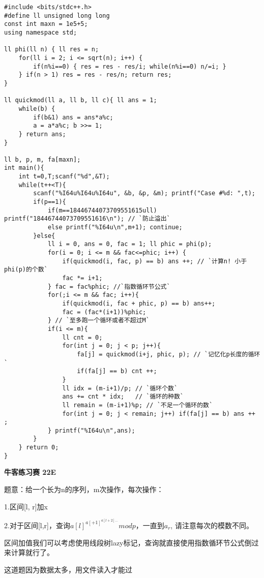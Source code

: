 \begin{lstlisting}
#include <bits/stdc++.h>
#define ll unsigned long long
const int maxn = 1e5+5;
using namespace std;

ll phi(ll n) { ll res = n;
    for(ll i = 2; i <= sqrt(n); i++) {
        if(n%i==0) { res = res - res/i; while(n%i==0) n/=i; }
    } if(n > 1) res = res - res/n; return res;
}

ll quickmod(ll a, ll b, ll c){ ll ans = 1;
    while(b) {
        if(b&1) ans = ans*a%c;
        a = a*a%c; b >>= 1;
    } return ans;
}

ll b, p, m, fa[maxn];
int main(){
    int t=0,T;scanf("%d",&T);
    while(t++<T){
        scanf("%I64u%I64u%I64u", &b, &p, &m); printf("Case #%d: ",t);
        if(p==1){
            if(m==18446744073709551615ull) printf("18446744073709551616\n"); // `防止溢出`
            else printf("%I64u\n",m+1); continue;
        }else{
            ll i = 0, ans = 0, fac = 1; ll phic = phi(p);
            for(i = 0; i <= m && fac<=phic; i++) {
                if(quickmod(i, fac, p) == b) ans ++; // `计算n! 小于 phi(p)的个数`
                fac *= i+1;
            } fac = fac%phic; //`指数循环节公式`
            for(;i <= m && fac; i++){
                if(quickmod(i, fac + phic, p) == b) ans++;
                fac = (fac*(i+1))%phic;
            } // `至多跑一个循环或者不超过M`
            if(i <= m){
                ll cnt = 0;
                for(int j = 0; j < p; j++){
                    fa[j] = quickmod(i+j, phic, p); // `记忆化p长度的循环`
                    if(fa[j] == b) cnt ++;
                }
                ll idx = (m-i+1)/p; // `循环个数`
                ans += cnt * idx;   // `循环的种数`
                ll remain = (m-i+1)%p; // `不足一个循环的数`
                for(int j = 0; j < remain; j++) if(fa[j] == b) ans ++ ;
            } printf("%I64u\n",ans);
        }
    } return 0;
}
\end{lstlisting}

{\bfseries 牛客练习赛 22E}

题意：给一个长为n的序列，m次操作，每次操作： 

1.区间[l, r]加x

2.对于区间[l,r]，查询$a[l]^{a[+1]^{a[l+2]...}} mod p$，一直到$a_r$, 请注意每次的模数不同。

区间加值我们可以考虑使用线段树lazy标记，查询就直接使用指数循环节公式倒过来计算就行了。

这道题因为数据太多，用文件读入才能过


